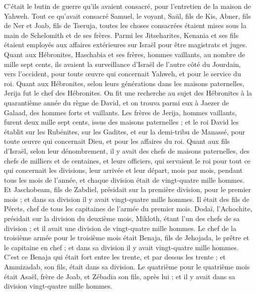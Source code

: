 \begin{multicols}{2}
C'était le butin de guerre qu'ils avaient consacré, pour l'entretien de la maison de Yahweh.
Tout ce qu'avait consacré Samuel, le voyant, Saül, fils de Kis, Abner, fils de Ner et Joab, fils de Tseruja, toutes les choses consacrées étaient mises sous la main de Schelomith et de ses frères.
Parmi les Jitseharites, Kenania et ses fils étaient employés aux affaires extérieures sur Israël pour être magistrats et juges.
Quant aux Hébronites, Haschabia et ses frères, hommes vaillants, au nombre de mille sept cents, ils avaient la surveillance d'Israël de l'autre côté du Jourdain, vers l'occident, pour toute œuvre qui concernait Yahweh, et pour le service du roi.
Quant aux Hébronites, selon leurs générations dans les maisons paternelles, Jerija fut le chef des Hébronites. On fit une recherche au sujet des Hébronites à la quarantième année du règne de David, et on trouva parmi eux à Jaezer de Galaad, des hommes forts et vaillants.
Les frères de Jerija, hommes vaillants, furent deux mille sept cents, issus des maisons paternelles ; et le roi David les établit sur les Rubénites, sur les Gadites, et sur la demi-tribu de Manassé, pour toute œuvre qui concernait Dieu, et pour les affaires du roi.
\VerseOne{}Quant aux fils d'Israël, selon leur dénombrement, il y avait des chefs de maisons paternelles, des chefs de milliers et de centaines, et leurs officiers, qui servaient le roi pour tout ce qui concernait les divisions, leur arrivée et leur départ, mois par mois, pendant tous les mois de l'année, et chaque division était de vingt-quatre mille hommes.
Et Jaschobeam, fils de Zabdiel, présidait sur la première division, pour le premier mois ; et dans sa division il y avait vingt-quatre mille hommes.
Il était des fils de Pérets, chef de tous les capitaines de l'armée du premier mois.
Dodaï, l'Achochite, présidait sur la division du deuxième mois, Mikloth, étant l'un des chefs de sa division ; et il avait une division de vingt-quatre mille hommes.
Le chef de la troisième armée pour le troisième mois était Benaja, fils de Jehojada, le prêtre et le capitaine en chef ; et dans sa division il y avait vingt-quatre mille hommes.
C'est ce Benaja qui était fort entre les trente, et par dessus les trente ; et Ammizadab, son fils, était dans sa division.
Le quatrième pour le quatrième mois était Asaël, frère de Joab, et Zébadia son fils, après lui ; et il y avait dans sa division vingt-quatre mille hommes.

\end{multicols}
